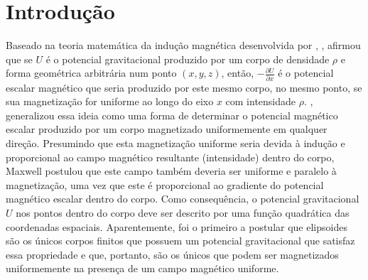 \chapter{Introdução}


Baseado na teoria matemática da indução magnética desenvolvida por
\citet{poisson1824}, \citet{maxwell1873}, afirmou que se $U$ 
é o potencial gravitacional produzido por um corpo de 
densidade $\rho$ e forma geométrica arbitrária num ponto $(x, y, z)$,
então, $-\frac{\partial U}{\partial x}$ é o potencial escalar magnético que seria
produzido por este mesmo corpo, no mesmo ponto, se sua magnetização for 
uniforme ao longo do eixo $x$ com intensidade $\rho$.
\citet{maxwell1873}, generalizou essa ideia como uma forma de
determinar o potencial magnético escalar produzido por um corpo 
magnetizado uniformemente em qualquer direção. Presumindo que 
esta magnetização uniforme seria devida à indução e proporcional ao campo magnético resultante (intensidade) dentro do corpo, Maxwell postulou que este campo também deveria ser uniforme e paralelo à magnetização, uma vez que este é proporcional ao gradiente do potencial magnético escalar dentro do corpo.
Como consequência, o potencial gravitacional $U$ nos pontos dentro do
corpo deve ser descrito por uma função quadrática das coordenadas espaciais.
Aparentemente, \citet{maxwell1873} foi o primeiro a postular que elipsoides
são os únicos corpos finitos que possuem um potencial gravitacional que
satisfaz essa propriedade e que, portanto, são os únicos que podem ser
magnetizados uniformemente na presença de um campo magnético uniforme.

